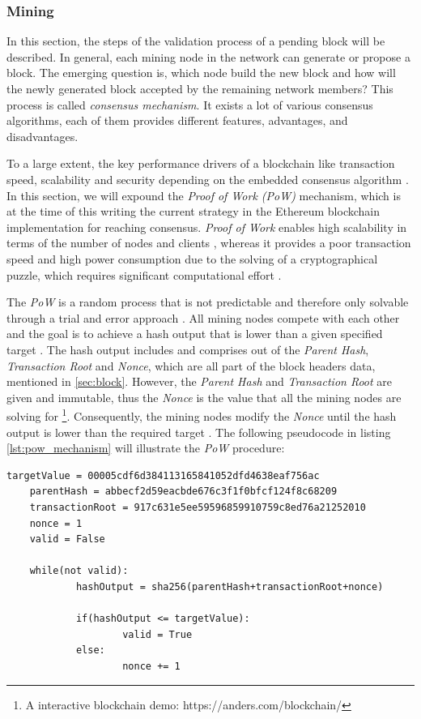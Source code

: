 \subsubsection{Mining}
\label{sec:mining}
In this section, the steps of the validation process of a pending block will be described. 
In general, each mining node in the network can generate or propose a block. 
The emerging question is, which node build the new block and how will the newly 
generated block accepted by the remaining network members? 
This process is called \textit{consensus mechanism}.
It exists a lot of various consensus algorithms, each of them provides different features,
advantages, and disadvantages. 

To a large extent, the key performance drivers of a blockchain
like transaction speed, scalability and security depending on the embedded consensus algorithm . 
In this section, we will expound the \textit{Proof of Work (PoW)} mechanism, 
which is at the time of this writing the current strategy in the Ethereum blockchain 
implementation for reaching consensus. 
\textit{Proof of Work} enables high scalability in terms of the number 
of nodes and clients , whereas it provides a poor transaction speed and high 
power consumption due to the solving of a cryptographical puzzle, which requires 
significant computational effort . 

The \textit{PoW} is a random process that is not predictable and therefore only solvable through a 
trial and error approach . 
All mining nodes compete with each other and the goal is to achieve a hash output that 
is lower than a given specified target .
The hash output includes and comprises out of the \textit{Parent Hash}, \textit{Transaction Root} and
\textit{Nonce}, which are all part of the block headers data, mentioned in \ref{sec:block}.
However, the \textit{Parent Hash} and \textit{Transaction Root} are given and immutable, thus the \textit{Nonce}
is the value that all the mining nodes are solving for \footnote{A interactive blockchain demo: https://anders.com/blockchain/}.
Consequently, the mining nodes modify the \textit{Nonce} until the hash output is lower than the required target .
The following pseudocode in listing \ref{lst:pow_mechanism} will illustrate the \textit{PoW} procedure:

\vspace{7mm}
\begin{lstlisting}[label={lst:pow_mechanism}, caption={Pseudocode for PoW mechanism}]
	targetValue = 00005cdf6d384113165841052dfd4638eaf756ac
	parentHash = abbecf2d59eacbde676c3f1f0bfcf124f8c68209
	transactionRoot = 917c631e5ee59596859910759c8ed76a21252010
	nonce = 1
	valid = False

	while(not valid):
			hashOutput = sha256(parentHash+transactionRoot+nonce)
		
			if(hashOutput <= targetValue):
					valid = True
			else:
					nonce += 1

\end{lstlisting}
\clearpage

